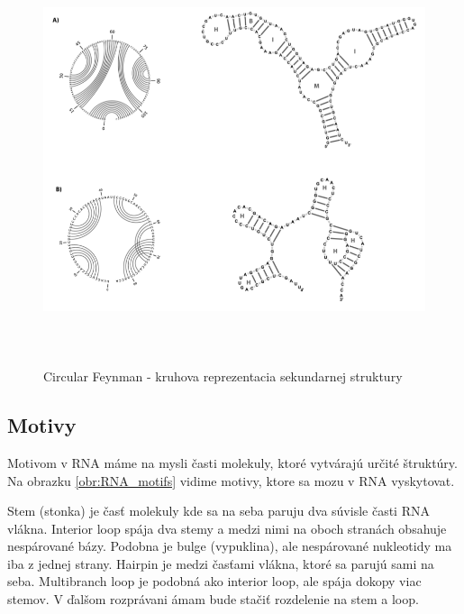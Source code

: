 \begin{figure}[H]
\centering
\includegraphics[width=140mm, height=120mm]{../img/RNA_circular_reprezentation.png}
\caption{Circular Feynman - kruhova reprezentacia sekundarnej struktury}
\label{obr:RNA_circular_representation}
\end{figure}


\subsection{Motivy}

Motivom v RNA máme na mysli časti molekuly, ktoré vytvárajú určité štruktúry.
Na obrazku \ref{obr:RNA_motifs} vidime motivy, ktore sa mozu v RNA vyskytovat.

Stem (stonka) je časť molekuly kde sa na seba paruju dva súvisle časti RNA vlákna.
Interior loop spája dva stemy a medzi nimi na oboch stranách obsahuje nespárované
bázy. Podobna je bulge (vypuklina), ale nespárované nukleotidy ma iba z jednej strany.
Hairpin je medzi časťami vlákna, ktoré sa parujú sami na seba.
Multibranch loop je podobná ako interior loop, ale spája dokopy viac stemov.
V ďalšom rozprávani ámam bude stačiť rozdelenie na stem a loop.


